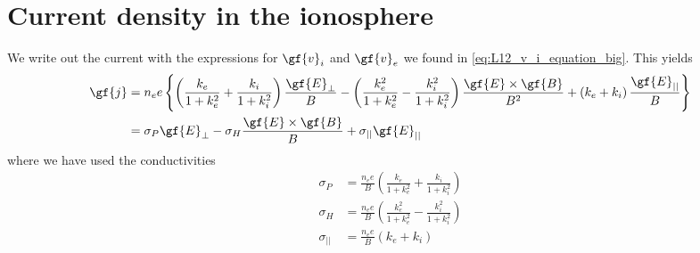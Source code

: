 \section{Current density in the ionosphere}
We write out the current with the expressions for \(\gf{v}_i\) and \(\gf{v}_e\) we found in \cref{eq:L12_v_i_equation_big}. This yields
\begin{align}
    \gf{j}&=n_{e}e\left \{\left(\frac{k_e}{1+k_e^2}+\frac{k_i}{1+k_i^2}\right)\frac{\gf{E}_\perp}{B}-\left(\frac{k_e^2}{1+k_e^2}-\frac{k_i^2}{1+k_i^2}\right)\frac{\gf{E}\times\gf{B}}{B^2}+\left(k_e+k_i\right)\frac{\gf{E}_{||}}{B}\right \}\notag \\
    &=\sigma_P\gf{E}_\perp-\sigma_H\frac{\gf{E}\times\gf{B}}{B}+\sigma_{||}\gf{E}_{||}\label{eq:L14_current_equation}
\end{align}
where we have used the conductivities
\begin{align*}
    \sigma_P&=\frac{n_{e}e}{B}\left(\frac{k_e}{1+k_e^2}+\frac{k_i}{1+k_i^2}\right)\\
    \sigma_H&=\frac{n_{e}e}{B}\left(\frac{k_e^2}{1+k_e^2}-\frac{k_i^2}{1+k_i^2}\right)\\
    \sigma_{||}&=\frac{n_{e}e}{B}\left(k_e+k_i\right)\\
\end{align*}

